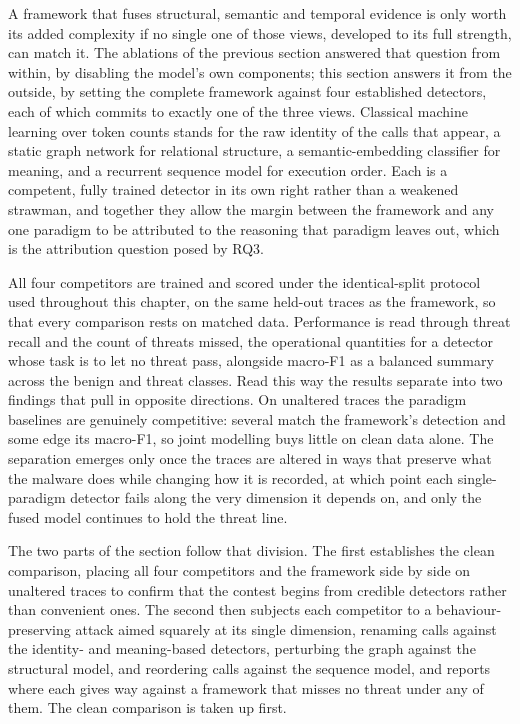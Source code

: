 \documentclass[%
    BCOR=10mm,
    DIV=13,
    toc=bibliography,
    toc=listof,
    oneside,
    12pt,
]{scrbook}
\begin{document}
A framework that fuses structural, semantic and temporal evidence is only worth
its added complexity if no single one of those views, developed to its full
strength, can match it. The ablations of the previous section answered that
question from within, by disabling the model's own components; this section
answers it from the outside, by setting the complete framework against four
established detectors, each of which commits to exactly one of the three views.
Classical machine learning over token counts stands for the raw identity of the
calls that appear, a static graph network for relational structure, a
semantic-embedding classifier for meaning, and a recurrent sequence model for
execution order. Each is a competent, fully trained detector in its own right
rather than a weakened strawman, and together they allow the margin between the
framework and any one paradigm to be attributed to the reasoning that paradigm
leaves out, which is the attribution question posed by RQ3.

All four competitors are trained and scored under the identical-split protocol
used throughout this chapter, on the same held-out traces as the framework, so
that every comparison rests on matched data. Performance is read through threat
recall and the count of threats missed, the operational quantities for a
detector whose task is to let no threat pass, alongside macro-F1 as a balanced
summary across the benign and threat classes. Read this way the results separate
into two findings that pull in opposite directions. On unaltered traces the
paradigm baselines are genuinely competitive: several match the framework's
detection and some edge its macro-F1, so joint modelling buys little on clean
data alone. The separation emerges only once the traces are altered in ways that
preserve what the malware does while changing how it is recorded, at which point
each single-paradigm detector fails along the very dimension it depends on, and
only the fused model continues to hold the threat line.

The two parts of the section follow that division. The first establishes the
clean comparison, placing all four competitors and the framework side by side on
unaltered traces to confirm that the contest begins from credible detectors
rather than convenient ones. The second then subjects each competitor to a
behaviour-preserving attack aimed squarely at its single dimension, renaming
calls against the identity- and meaning-based detectors, perturbing the graph
against the structural model, and reordering calls against the sequence model,
and reports where each gives way against a framework that misses no threat under
any of them. The clean comparison is taken up first.
\end{document}
